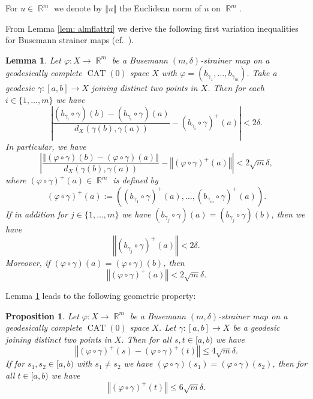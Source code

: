 \documentclass[a4paper,12pt]{amsart}
\newcommand{\CAT}{\operatorname{CAT}}
\newcommand{\R}{\operatorname{\mathbb{R}}}
\numberwithin{equation}{section}
\theoremstyle{plain}
\newtheorem{lem}[thm]{Lemma}
\newtheorem{prop}[thm]{Proposition}
\theoremstyle{definition}
\theoremstyle{remark}
\begin{document}
For $u \in \R^m$
we denote by $\Vert u \Vert$
the Euclidean norm of $u$ on $\R^m$.

From Lemma \ref{lem: almflattri}
we derive the following first variation inequalities 
for Busemann strainer maps
(cf.~\cite[Proposition 8.5]{lytchak-nagano1}).

\begin{lem}\label{lem: 1stvfbstr0}
Let 
$\varphi \colon X \to \R^m$
be a Busemann $(m,\delta)$-strainer map on 
a geodesically complete $\CAT(0)$ space $X$
with $\varphi = \left( b_{\gamma_1}, \dots, b_{\gamma_m} \right)$.
Take a geodesic $\gamma \colon [a,b] \to X$ 
joining distinct two points in $X$.
Then for each $i \in \{ 1, \dots, m \}$ we have
\[
\left\vert
\frac{\left( b_{\gamma_i} \circ \gamma \right)(b) - 
\left( b_{\gamma_i} \circ \gamma \right)(a)}
{d_X \left( \gamma(b), \gamma(a) \right)}
- \left( b_{\gamma_i} \circ \gamma \right)^+(a)
\right\vert
< 2\delta.
\] 
In particular, we have
\[
\left\vert
\frac{\left\Vert \left( \varphi \circ \gamma \right)(b) - 
\left( \varphi \circ \gamma \right)(a) \right\Vert}
{d_X \left( \gamma(b), \gamma(a) \right)}
- \left\Vert \left( \varphi \circ \gamma \right)^+(a) \right\Vert
\right\vert
< 2 \sqrt{m} \delta,
\]
where 
$\left( \varphi \circ \gamma \right)^+(a) \in \R^m$
is defined by
\[
\left( \varphi \circ \gamma \right)^+(a) := 
\left( \left( b_{\gamma_1} \circ \gamma \right)^+(a), \dots, 
\left( b_{\gamma_m} \circ \gamma \right)^+(a) \right).
\]
If in addition for $j \in \{ 1, \dots, m \}$ we have
$\left( b_{\gamma_j} \circ \gamma \right)(a) = 
\left( b_{\gamma_j} \circ \gamma \right)(b)$,
then we have
\[
\left\Vert \left( b_{\gamma_j} \circ \gamma \right)^+(a) \right\Vert 
< 2\delta.
\]
Moreover,
if 
$\left( \varphi \circ \gamma \right)(a) = 
\left( \varphi \circ \gamma \right)(b)$,
then 
\[
\left\Vert \left( \varphi \circ \gamma \right)^+(a) \right\Vert 
< 2 \sqrt{m} \delta.
\]
\end{lem}

Lemma \ref{lem: 1stvfbstr0} 
leads to the following geometric property:

\begin{prop}\label{prop: 1stvfbstr}
Let 
$\varphi \colon X \to \R^m$
be a Busemann $(m,\delta)$-strainer map on 
a geodesically complete $\CAT(0)$ space $X$.
Let $\gamma \colon [a,b] \to X$ be a geodesic
joining distinct two points in $X$.
Then for all $s, t \in [a,b)$ we have
\[
\left\Vert \left( \varphi \circ \gamma \right)^+(s) - 
\left( \varphi \circ \gamma \right)^+(t) \right\Vert
\le 4 \sqrt{m} \delta.
\]
If for $s_1, s_2 \in [a,b)$ with $s_1 \neq s_2$
we have
$\left( \varphi \circ \gamma \right)(s_1) = 
\left( \varphi \circ \gamma \right)(s_2)$,
then for all $t \in [a,b)$ we have
\[
\left\Vert \left( \varphi \circ \gamma \right)^+(t) \right\Vert
\le 6 \sqrt{m} \delta.
\]
\end{prop}
\end{document}
